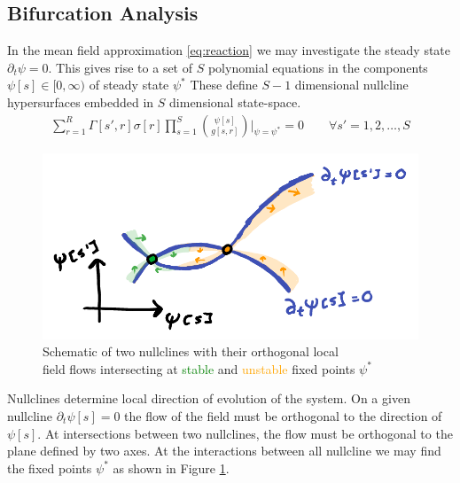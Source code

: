 \subsection{Bifurcation Analysis}
In the mean field approximation \eqref{eq:reaction} we may investigate the
steady state $\partial_t\psi=0$. This gives rise to a set of $S$ polynomial
equations in the components $\psi[s]\in[0,\infty)$ of steady state $\psi^*$
These define $S-1$ dimensional nullcline hypersurfaces embedded in $S$
dimensional state-space.
\begin{align}
	\sum_{r=1}^R\Gamma[s',r]\sigma[r]
		\prod_{s=1}^S{\psi[s] \choose g[s,r]}
		\bigg|_{\psi=\psi^*}
		=0\qquad\forall s'=1,2,\dots,S
	\label{eq:steadystate}
\end{align}

\begin{figure}[H]
\centering{}
\captionsetup{justification=centering}
\includegraphics[scale=0.35]{figures/nullclines}
\caption{Schematic of two nullclines with their orthogonal local\\ field flows intersecting
at \textcolor{Green}{stable} and \textcolor{orange}{unstable} fixed points $\psi^*$}
\label{fig:nullclines}
\end{figure}
Nullclines determine local direction of evolution of the system. On a given
nullcline $\partial_t\psi[s]=0$ the flow of the field must be orthogonal to
the direction of $\psi[s]$. At intersections between two nullclines, the flow
must be orthogonal to the plane defined by two axes. At the interactions between
all nullcline we may find the fixed points $\psi^*$ as shown in Figure \ref{fig:nullclines}.


